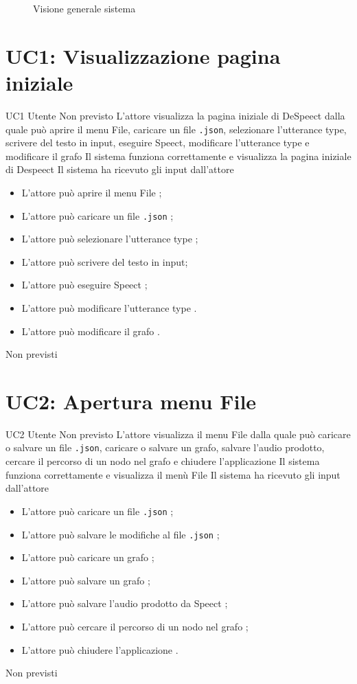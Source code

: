 \documentclass[../AnalisideiRequisiti.tex]{subfiles}
\begin{document}
\begin{figure}[H]
	\caption{Visione generale sistema}
	
	\end{figure}
 	
	\section{UC1: Visualizzazione pagina iniziale} 
		
	\UserCase
	{UC1}
	{Utente}
	{Non previsto}
	{L'attore visualizza la pagina iniziale di DeSpeect dalla quale può aprire il menu File, caricare un file \verb|.json|, selezionare l'utterance type, scrivere del testo in input, eseguire Speect, modificare l'utterance type e modificare il grafo}
	{Il sistema funziona correttamente e visualizza la pagina iniziale di Despeect}
	{Il sistema ha ricevuto gli input dall'attore}
	{\begin{itemize}
			\item{} L'attore può aprire il menu File ;
			\item{} L'attore può caricare un file \verb|.json| ;
			\item{} L'attore può selezionare l'utterance type ;
			\item{} L'attore può scrivere del testo in input;
			\item{} L'attore può eseguire Speect ;
			\item{} L'attore può modificare l'utterance type .
			\item{} L'attore può modificare il grafo .
	\end{itemize}}
	{Non previsti}
	
	
	\section{UC2: Apertura menu File}

	\UserCase
	{UC2}
	{Utente}
	{Non previsto}
	{L'attore visualizza il menu File dalla quale può caricare o salvare un file \verb|.json|, caricare o salvare un grafo, salvare l'audio prodotto, cercare il percorso di un nodo nel grafo e chiudere l'applicazione}
	{Il sistema funziona correttamente e visualizza il menù File}
	{Il sistema ha ricevuto gli input dall'attore}
	{	\begin{itemize}
		\item{} L'attore può caricare un file \verb|.json| ;
		\item{} L'attore può salvare le modifiche al file \verb|.json| ;
		\item{} L'attore può caricare un grafo ;
		\item{} L'attore può salvare un grafo ;
		\item{} L'attore può salvare l'audio prodotto da Speect ;
		\item{} L'attore può cercare il percorso di un nodo nel grafo ;
		\item{} L'attore può chiudere l'applicazione .
		\end{itemize}
	}
	{Non previsti}
\end{document}

